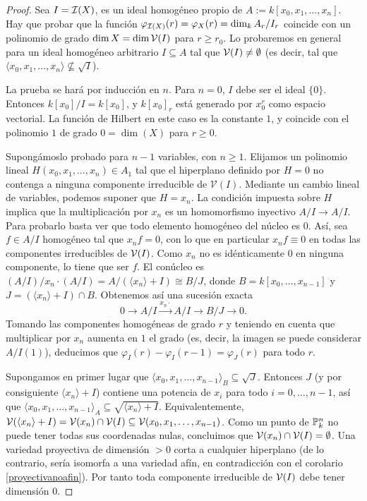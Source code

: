 \documentclass[ACGA.tex]{subfiles}
\begin{document}
\begin{proof}
Sea $I=\mathcal{I}(X)$, es un ideal homogéneo propio de $A:=k[x_0,x_1,\ldots,x_n]$. Hay que probar que la función $\varphi_{\mathcal{I}(X)}(r)=\varphi_X(r)=\dim_k A_r/I_r$ coincide con un polinomio de grado $\dim X=\dim\mathcal{V}(I)$ para $r\geq r_0$. Lo probaremos en general para un ideal homogéneo arbitrario $I\subseteq A$ tal que $\mathcal{V}(I)\neq\emptyset$ (es decir, tal que $\langle x_0,x_1,\ldots,x_n\rangle\not\subseteq \sqrt{I}$).

 La prueba se hará por inducción en $n$. Para $n=0$, $I$ debe ser el ideal $\{0\}$. Entonces $k[x_0]/I=k[x_0]$, y $k[x_0]_r$ está generado por $x_0^r$ como espacio vectorial. La función de Hilbert en este caso es la constante $1$, y coincide con el polinomio $1$ de grado $0=\dim(X)$ para $r\geq 0$.

Supongámoslo probado para $n-1$ variables, con $n\geq 1$. Elijamos un polinomio lineal $H(x_0,x_1,\ldots,x_n)\in A_1$ tal que el hiperplano definido por $H=0$ no contenga a ninguna componente irreducible de ${\mathcal V}(I)$. Mediante un cambio lineal de variables, podemos suponer que $H=x_n$. La condición impuesta sobre $H$ implica que la multiplicación por $x_n$ es un homomorfismo inyectivo $A/I\to A/I$. Para probarlo basta ver que todo elemento homogéneo del núcleo es 0. Así, sea $f\in A/I$ homogéneo tal que $x_nf=0$, con lo que en particular $x_nf\equiv 0$ en todas las componentes irreducibles de $\mathcal{V}(I)$. Como $x_n$ no es idénticamente 0 en ninguna componente, lo tiene que ser $f$. El conúcleo es $(A/I)/x_n\cdot(A/I)=A/(\langle x_n\rangle +I)\cong B/J$, donde $B=k[x_0,\ldots,x_{n-1}]$ y $J=(\langle x_n\rangle +I)\cap B$. Obtenemos así una sucesión exacta
$$
0\to A/I\stackrel{x_n\cdot}{\to} A/I \to B/J\to 0.
$$
Tomando las componentes homogéneas de grado $r$ y teniendo en cuenta que multiplicar por $x_n$ aumenta en $1$ el grado (es, decir, la imagen se puede considerar $A/I(1)$), deducimos que $\varphi_I(r)-\varphi_I(r-1)=\varphi_J(r)$ para todo $r$.

Supongamos en primer lugar que $\langle x_0,x_1,\ldots,x_{n-1}\rangle_B\subseteq \sqrt{J}$. Entonces $J$ (y por consiguiente $\langle x_n\rangle +I$) contiene una potencia de $x_i$ para todo $i=0,\ldots,n-1$, así que $\langle x_0,x_1,\ldots,x_{n-1}\rangle_A\subseteq \sqrt{\langle x_n\rangle +I}$. Equivalentemente, $\mathcal{V}(\langle x_n\rangle +I)=\mathcal{V}(x_n)\cap\mathcal{V}(I)\subseteq\mathcal{V}(x_0,x_1,\ldots,x_{n-1})$. Como un punto de $\mathbb{P}^n_k$ no puede tener todas sus coordenadas nulas, concluimos que $\mathcal{V}(x_n)\cap\mathcal{V}(I)=\emptyset$. Una variedad proyectiva de dimensión $>0$ corta a cualquier hiperplano (de lo contrario, sería isomorfa a una variedad afín, en contradicción con el corolario \ref{proyectivanoafin}). Por tanto toda componente irreducible de $\mathcal{V}(I)$ debe tener dimensión $0$.


\end{proof}
\end{document}

